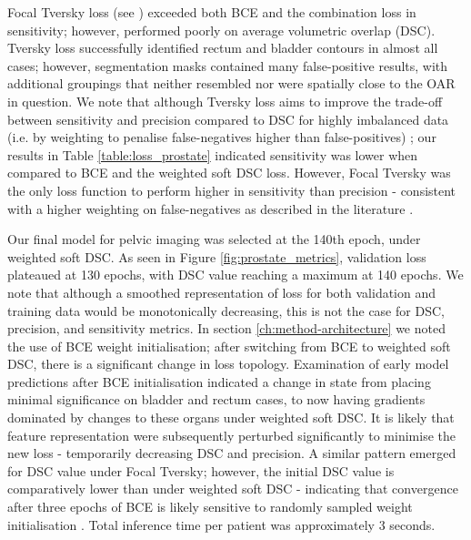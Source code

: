 Focal Tversky loss (see \cite{Khan2019}) exceeded both BCE and the combination loss in sensitivity; however, performed poorly on average volumetric overlap (DSC). Tversky loss successfully identified rectum and bladder contours in almost all cases; however, segmentation masks contained many false-positive results, with additional groupings that neither resembled nor were spatially close to the OAR in question. We note that although Tversky loss aims to improve the trade-off between sensitivity and precision compared to DSC for highly imbalanced data (i.e. by weighting to penalise false-negatives higher than false-positives) \cite{taghanaki2018}; our results in Table \ref{table:loss_prostate} indicated sensitivity was lower when compared to BCE and the weighted soft DSC loss. However, Focal Tversky was the only loss function to perform higher in sensitivity than precision - consistent with a higher weighting on false-negatives as described in the literature \cite{Khan2019}.



Our final model for pelvic imaging was selected at the 140th epoch, under weighted soft DSC. As seen in Figure \ref{fig:prostate_metrics}, validation loss plateaued at 130 epochs, with DSC value reaching a maximum at 140 epochs. We note that although a smoothed representation of loss for both validation and training data would be monotonically decreasing, this is not the case for DSC, precision, and sensitivity metrics. In section \ref{ch:method-architecture} we noted the use of BCE weight initialisation; after switching from BCE to weighted soft DSC, there is a significant change in loss topology. Examination of early model predictions after BCE initialisation indicated a change in state from placing minimal significance on bladder and rectum cases, to now having gradients dominated by changes to these organs under weighted soft DSC. It is likely that feature representation were subsequently perturbed significantly to minimise the new loss - temporarily decreasing DSC and precision. A similar pattern emerged for DSC value under Focal Tversky; however, the initial DSC value is comparatively lower than under weighted soft DSC - indicating that convergence after three
epochs of BCE is likely sensitive to randomly sampled weight initialisation \cite{Ronneberger_2015}. Total inference time per patient was approximately 3 seconds.

